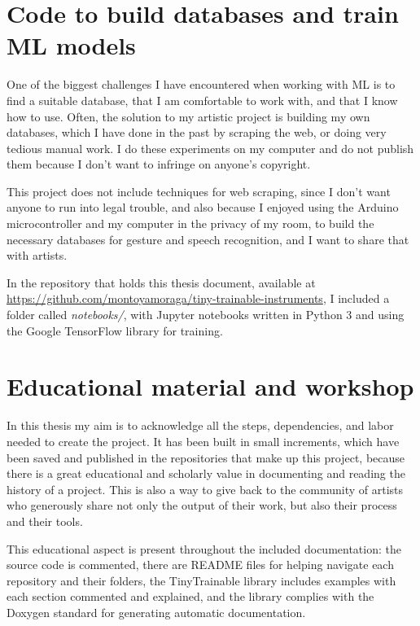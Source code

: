 \section{Code to build databases and train ML models}

One of the biggest challenges I have encountered when working with \acrshort{ML} is to find a suitable database, that I am comfortable to work with, and that I know how to use. Often, the solution to my artistic project is building my own databases, which I have done in the past by scraping the web, or doing very tedious manual work. I do these experiments on my computer and do not publish them because I don't want to infringe on anyone's copyright.

This project does not include techniques for web scraping, since I don't want anyone to run into legal trouble, and also because I enjoyed using the Arduino microcontroller and my computer in the privacy of my room, to build the necessary databases for gesture and speech recognition, and I want to share that with artists.

In the repository that holds this thesis document, available at \url{https://github.com/montoyamoraga/tiny-trainable-instruments}, I included a folder called \emph{notebooks/}, with Jupyter notebooks written in Python 3 and using the Google TensorFlow library for training.

\section{Educational material and workshop}

In this thesis my aim is to acknowledge all the steps, dependencies, and labor needed to create the project. It has been built in small increments, which have been saved and published in the repositories that make up this project, because there is a great educational and scholarly value in documenting and reading the history of a project. This is also a way to give back to the community of artists who generously share not only the output of their work, but also their process and their tools.

This educational aspect is present throughout the included documentation: the source code is commented, there are README files for helping navigate each repository and their folders, the TinyTrainable library includes examples with each section commented and explained, and the library complies with the Doxygen standard for generating automatic documentation.

